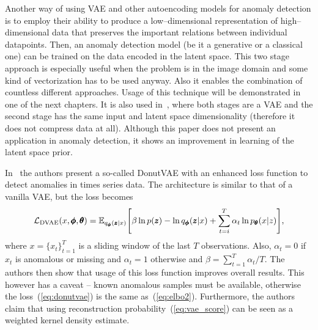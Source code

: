 Another way of using VAE and other autoencoding models for anomaly
detection is to employ their ability to produce a low--dimensional
representation of high--dimensional data that preserves the important
relations between individual datapoints. Then, an anomaly detection
model (be it a generative or a classical one) can be trained on the
data encoded in the latent space. This two stage approach is especially
useful when the problem is in the image domain and some kind of vectorization
has to be used anyway. Also it enables the combination of countless
different approaches. Usage of this technique will be demonstrated
in one of the next chapters. It is also used in~\cite{dai2019diagnosing},
where both stages are a VAE and the second stage has the same input
and latent space dimensionality (therefore it does not compress data
at all). Although this paper does not present an application in anomaly
detection, it shows an improvement in learning of the latent space
prior. 

In~\cite{xu2018unsupervised} the authors present a so-called DonutVAE
with an enhanced loss function to detect anomalies in times series
data. The architecture is similar to that of a vanilla VAE, but the
loss becomes
\begin{equation}
\mathcal{L}_{\text{DVAE}}(x,\vc{\phi},\vc{\theta})=\mathbb{E}_{q_{\vc{\phi}}(\vc{z}|x)}\left[\beta\ln p(\vc{z})-\ln q_{\vc{\phi}}(\vc{z}|x)+\sum_{t=i}^{T}\alpha_{t}\ln p_{\vc{\theta}}(x|z)\right],\label{eq:donutvae}
\end{equation}
where $x=\{x_{t}\}_{t=1}^{T}$ is a sliding window of the last $T$
observations. Also, $\alpha_{t}=0$ if $x_{t}$ is anomalous or missing
and $\alpha_{t}=1$ otherwise and $\beta=\sum_{t=1}^{T}\alpha_{t}/T$.
The authors then show that usage of this loss function improves overall
results. This however has a caveat -- known anomalous samples must
be available, otherwise the loss~(\ref{eq:donutvae}) is the same
as~(\ref{eq:elbo2}). Furthermore, the authors claim that using
reconstruction probability~(\ref{eq:vae_score}) can be seen as
a weighted kernel density estimate.

